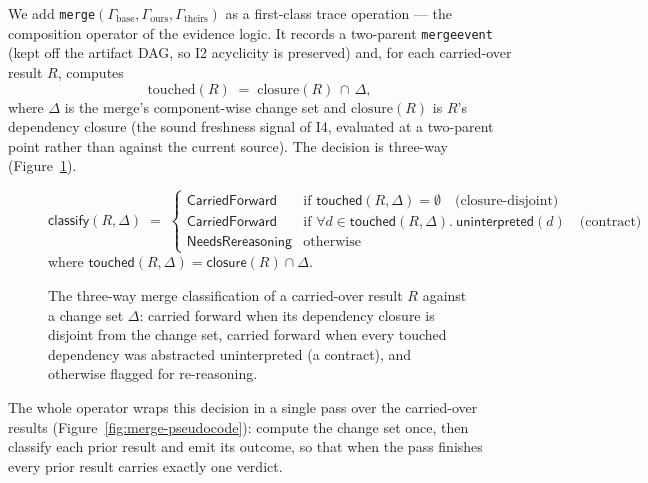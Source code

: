 \documentclass[11pt]{article}
\newcommand{\codeus}{\textunderscore\penalty100\relax}
\newcommand{\code}[1]{\texttt{\let\_\codeus #1}}
\newcommand{\id}[1]{\ensuremath{\mathsf{#1}}}   %
\begin{document}
We add \code{merge}$(\Gamma_{\text{base}}, \Gamma_{\text{ours}}, \Gamma_{\text{theirs}})$ as a first-class
trace operation --- the composition operator of the evidence logic. It records a two-parent
\code{merge\_event} (kept off the artifact DAG, so I2 acyclicity is preserved) and, for each carried-over
result $R$, computes
\[
\text{touched}(R) \;=\; \text{closure}(R) \,\cap\, \Delta,
\]
where $\Delta$ is the merge's component-wise change set and $\text{closure}(R)$ is $R$'s dependency closure
(the sound freshness signal of I4, evaluated at a two-parent point rather than against the current source).
The decision is three-way (Figure~\ref{fig:core-merge-classify}).
\begin{figure}[H]
\centering
\[
\id{classify}(R,\Delta) \;=\;
\begin{cases}
\id{CarriedForward} & \text{if } \id{touched}(R,\Delta) = \emptyset \quad\text{(closure-disjoint)}\\[2pt]
\id{CarriedForward} & \text{if } \forall d \in \id{touched}(R,\Delta).\ \id{uninterpreted}(d) \quad\text{(contract)}\\[2pt]
\id{NeedsRereasoning} & \text{otherwise}
\end{cases}
\]
where\; $\id{touched}(R,\Delta) = \id{closure}(R) \cap \Delta$.
\caption{The three-way merge classification of a carried-over result $R$ against a change set $\Delta$: carried forward when its dependency closure is disjoint from the change set, carried forward when every touched dependency was abstracted uninterpreted (a contract), and otherwise flagged for re-reasoning.}
\label{fig:core-merge-classify}
\end{figure}
The whole operator wraps this decision in a single pass over the carried-over results
(Figure~\ref{fig:merge-pseudocode}): compute the change set once, then classify each prior result and emit
its outcome, so that when the pass finishes every prior result carries exactly one verdict.
\end{document}
